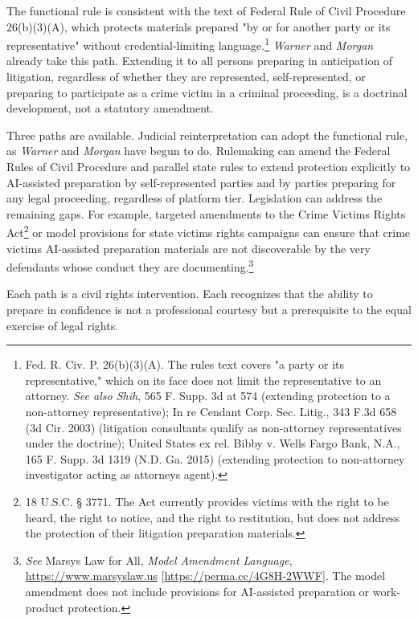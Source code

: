 \documentclass[
  12pt,
]{article}
\begin{document}
The functional rule is consistent with the text of Federal Rule of Civil
Procedure 26(b)(3)(A), which protects materials prepared "by or for
another party or its representative" without credential-limiting
language.\footnote{Fed. R. Civ. P. 26(b)(3)(A). The
  rule\textquotesingle s text covers "a party or its representative,"
  which on its face does not limit the representative to an attorney.
  \emph{See also Shih}, 565 F. Supp. 3d at 574 (extending protection to
  a non-attorney representative); In re Cendant Corp. Sec. Litig., 343
  F.3d 658 (3d Cir. 2003) (litigation consultants qualify as
  non-attorney representatives under the doctrine); United States ex
  rel. Bibby v. Wells Fargo Bank, N.A., 165 F. Supp. 3d 1319 (N.D. Ga.
  2015) (extending protection to non-attorney investigator acting as
  attorney\textquotesingle s agent).} \emph{Warner} and \emph{Morgan}
already take this path. Extending it to all persons preparing in
anticipation of litigation, regardless of whether they are represented,
self-represented, or preparing to participate as a crime victim in a
criminal proceeding, is a doctrinal development, not a statutory
amendment.

Three paths are available. Judicial reinterpretation can adopt the
functional rule, as \emph{Warner} and \emph{Morgan} have begun to do.
Rulemaking can amend the Federal Rules of Civil Procedure and parallel
state rules to extend protection explicitly to AI-assisted preparation
by self-represented parties and by parties preparing for any legal
proceeding, regardless of platform tier. Legislation can address the
remaining gaps. For example, targeted amendments to the Crime
Victims\textquotesingle{} Rights Act\footnote{18 U.S.C. § 3771. The Act
  currently provides victims with the right to be heard, the right to
  notice, and the right to restitution, but does not address the
  protection of their litigation preparation materials.} or model
provisions for state victims\textquotesingle{} rights campaigns can
ensure that crime victims\textquotesingle{} AI-assisted preparation
materials are not discoverable by the very defendants whose conduct they
are documenting.\footnote{\emph{See} Marsy\textquotesingle s Law for
  All, \emph{Model Amendment Language}, \url{https://www.marsyslaw.us}
  {[}\url{https://perma.cc/4G8H-2WWF}{]}. The model amendment does not
  include provisions for AI-assisted preparation or work-product
  protection.}

Each path is a civil rights intervention. Each recognizes that the
ability to prepare in confidence is not a professional courtesy but a
prerequisite to the equal exercise of legal rights.
\end{document}
